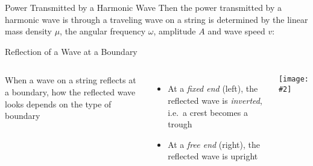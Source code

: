 \documentclass[12pt,aspectratio=169]{beamer}
\newcommand{\pic}[2]{\texttt{[image: \#2]}}
\newcommand{\eq}[2]{\vspace{#1}{\Large\begin{displaymath}#2\end{displaymath}}}
\begin{document}
\begin{frame}{Power Transmitted by a Harmonic Wave}
  Then the power transmitted by a harmonic wave is through a traveling wave on
  a string is determined by the linear mass density $\mu$, the angular frequency
  $\omega$, amplitude $A$ and wave speed $v$:

  \eq{-.3in}{
    \boxed{P=\frac{1}{2}\mu\omega^2A^2v}
  }
\end{frame}
%
%
%  


\begin{frame}{Reflection of a Wave at a Boundary}
  \begin{columns}
    When a wave on a string reflects at a boundary, how the reflected wave looks
    depends on the type of boundary
    \begin{itemize}
    \item At a \emph{fixed end} (left), the reflected wave is \emph{inverted},
      i.e.\ a crest becomes a trough
    \item At a \emph{free end} (right), the reflected wave is upright
    \end{itemize}
    
    \pic{1}{22.jpg}
  \end{columns}
\end{frame}
\end{document}
